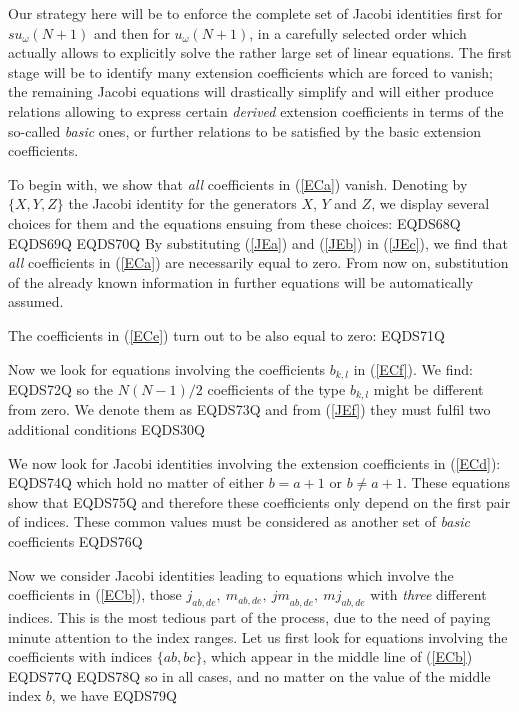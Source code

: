 \documentclass[12pt]{article}
\begin{document}
Our strategy here will be to enforce the complete set of Jacobi
identities  first for $su_{\omega}(N+1)$ and then for $u_{\omega}(N+1)$, in
a carefully selected order which actually allows to explicitly
solve the rather large set of linear equations. The first stage
will be to identify many extension coefficients which are forced to
vanish; the remaining Jacobi equations will drastically simplify
and will either produce relations allowing to express certain
\emph{derived} extension coefficients in terms of the so-called
\emph{basic} ones, or further relations to be satisfied by the basic
extension coefficients.

To begin with, we show that \emph{all} coefficients in
(\ref{ECa}) vanish.  Denoting by $\{X,Y,Z\}$ the Jacobi
identity for the generators $X$,
$Y$ and $Z$, we display several choices for them
and the equations ensuing from these choices:
EQDS68Q
EQDS69Q
EQDS70Q
By substituting (\ref{JEa}) and (\ref{JEb}) in (\ref{JEc}), we find
that \emph{all} coefficients in (\ref{ECa})  are necessarily equal to
zero. From now on, substitution of the already known information in
further equations will be automatically assumed.

The coefficients  in (\ref{ECe}) turn out to be also equal to zero:
EQDS71Q

Now we look for equations involving the  coefficients ${b}_{k,l}$
in (\ref{ECf}). We find:
EQDS72Q
so the $N(N-1)/2$ coefficients of the type ${b}_{k,l}$ might be
different from zero. We denote them as
EQDS73Q
and from  (\ref{JEf}) they must fulfil two additional conditions
EQDS30Q

We now look for Jacobi identities involving the  extension
coefficients in (\ref{ECd}):
EQDS74Q
which hold no matter of either $b=a+1$ or $b\ne a+1$. These
equations show that
EQDS75Q
and therefore these coefficients  only depend on the first pair of
indices. These common values must be considered as another set of
\emph{basic} coefficients
EQDS76Q

Now we consider Jacobi identities leading to equations which involve
the coefficients in  (\ref{ECb}), those ${j}_{ab,de},\ {m}_{ab,de},\
{jm}_{ab,de},\ {mj}_{ab,de}$ with \emph{three} different indices. This
is the most tedious part of the process, due to the need of paying
minute attention to the index ranges.  Let us first look for
equations involving the coefficients with indices $\{ab, bc\}$, which
appear in the middle line of (\ref{ECb})
EQDS77Q
EQDS78Q
so in all cases, and no matter on the value of the middle index $b$,
we have
EQDS79Q
\end{document}
